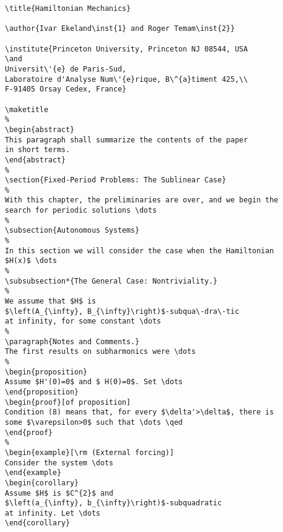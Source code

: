 \begin{verbatim}
\title{Hamiltonian Mechanics}

\author{Ivar Ekeland\inst{1} and Roger Temam\inst{2}}

\institute{Princeton University, Princeton NJ 08544, USA
\and
Universit\'{e} de Paris-Sud,
Laboratoire d'Analyse Num\'{e}rique, B\^{a}timent 425,\\
F-91405 Orsay Cedex, France}

\maketitle
%
\begin{abstract}
This paragraph shall summarize the contents of the paper
in short terms.
\end{abstract}
%
\section{Fixed-Period Problems: The Sublinear Case}
%
With this chapter, the preliminaries are over, and we begin the
search for periodic solutions \dots
%
\subsection{Autonomous Systems}
%
In this section we will consider the case when the Hamiltonian
$H(x)$ \dots
%
\subsubsection*{The General Case: Nontriviality.}
%
We assume that $H$ is
$\left(A_{\infty}, B_{\infty}\right)$-subqua\-dra\-tic
at infinity, for some constant \dots
%
\paragraph{Notes and Comments.}
The first results on subharmonics were \dots
%
\begin{proposition}
Assume $H'(0)=0$ and $ H(0)=0$. Set \dots
\end{proposition}
\begin{proof}[of proposition]
Condition (8) means that, for every $\delta'>\delta$, there is
some $\varepsilon>0$ such that \dots \qed
\end{proof}
%
\begin{example}[\rm (External forcing)]
Consider the system \dots
\end{example}
\begin{corollary}
Assume $H$ is $C^{2}$ and
$\left(a_{\infty}, b_{\infty}\right)$-subquadratic
at infinity. Let \dots
\end{corollary}
\end{verbatim}
